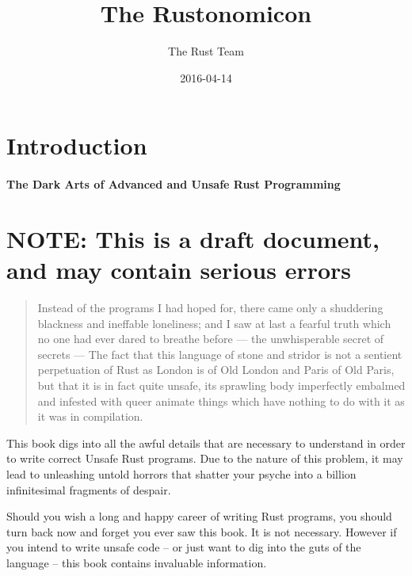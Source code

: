 \documentclass[a4paper,]{book}
\title{The Rustonomicon}
\author{The Rust Team}
\date{2016-04-14}
\begin{document}
  \maketitle



{
  \hypersetup{linkcolor=black}
  \setcounter{tocdepth}{2}
  \tableofcontents
  \newpage
}

\chapter{Introduction}\label{introduction}

\subsubsection{The Dark Arts of Advanced and Unsafe Rust
Programming}\label{the-dark-arts-of-advanced-and-unsafe-rust-programming}

\chapter{NOTE: This is a draft document, and may contain serious
errors}\label{note-this-is-a-draft-document-and-may-contain-serious-errors}

\begin{quote}
Instead of the programs I had hoped for, there came only a shuddering
blackness and ineffable loneliness; and I saw at last a fearful truth
which no one had ever dared to breathe before --- the unwhisperable
secret of secrets --- The fact that this language of stone and stridor
is not a sentient perpetuation of Rust as London is of Old London and
Paris of Old Paris, but that it is in fact quite unsafe, its sprawling
body imperfectly embalmed and infested with queer animate things which
have nothing to do with it as it was in compilation.
\end{quote}

This book digs into all the awful details that are necessary to
understand in order to write correct Unsafe Rust programs. Due to the
nature of this problem, it may lead to unleashing untold horrors that
shatter your psyche into a billion infinitesimal fragments of despair.

Should you wish a long and happy career of writing Rust programs, you
should turn back now and forget you ever saw this book. It is not
necessary. However if you intend to write unsafe code -- or just want to
dig into the guts of the language -- this book contains invaluable
information.
\end{document}
